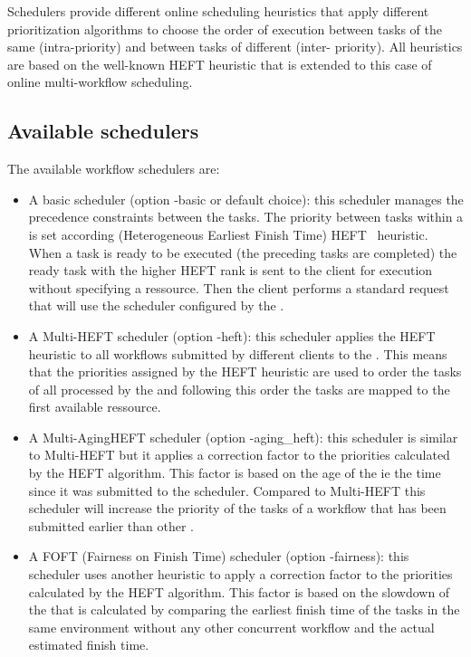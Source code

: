Schedulers provide different online scheduling heuristics that apply different
prioritization algorithms to choose the order of execution between tasks of the
same \DAG (intra-\DAG priority) and between tasks of different \DAGS (inter-\DAG
priority). All heuristics are based on the well-known HEFT heuristic that is
extended to this case of online multi-workflow scheduling.

\subsection{Available schedulers}

The available \madag workflow schedulers are:

\begin{itemize}

\item A basic scheduler (option -basic or default choice): this scheduler
  manages the precedence constraints between the tasks. The priority between
  tasks within a \DAG is set according (Heterogeneous Earliest Finish Time)
  HEFT~\cite{heft_cpop} heuristic. When a task is ready to be executed (\ie the
  preceding tasks are completed) the ready task with the higher HEFT rank is
  sent to the client for execution without specifying a ressource. Then the
  client performs a standard \diet request that will use the scheduler
  configured by the \sed.

\item A Multi-HEFT scheduler (option -heft): this scheduler applies the HEFT
  heuristic to all workflows submitted by different clients to the \madag. This
  means that the priorities assigned by the HEFT heuristic are used to order
  the tasks of all \DAGS processed by the \madag and following this order the
  tasks are mapped to the first available ressource.

\item A Multi-AgingHEFT scheduler (option -aging\_heft): this scheduler is
  similar to Multi-HEFT but it applies a correction factor to the priorities
  calculated by the HEFT algorithm. This factor is based on the age of the \DAG
  ie the time since it was submitted to the scheduler. Compared to Multi-HEFT
  this scheduler will increase the priority of the tasks of a workflow that has
  been submitted earlier than other \DAGS.

\item A FOFT (Fairness on Finish Time) scheduler (option -fairness): this
  scheduler uses another heuristic to apply a correction factor to the
  priorities calculated by the HEFT algorithm. This factor is based on the
  slowdown of the \DAG that is calculated by comparing the earliest finish time
  of the tasks in the same environment without any other concurrent workflow
  and the actual estimated finish time.

\end{itemize}

